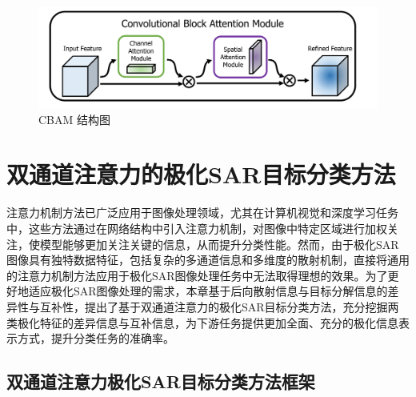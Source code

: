 \begin{figure}[h]
    \centering
    \includegraphics[width=14cm]{pic/chapter3/CBAM.jpg}
    \caption{CBAM 结构图}
    \label{CBAM}
\end{figure}

\section{双通道注意力的极化SAR目标分类方法}

注意力机制方法已广泛应用于图像处理领域，尤其在计算机视觉和深度学习任务中，这些方法通过在网络结构中引入注意力机制，对图像中特定区域进行加权关注，使模型能够更加关注关键的信息，从而提升分类性能。然而，由于极化SAR图像具有独特数据特征，包括复杂的多通道信息和多维度的散射机制，直接将通用的注意力机制方法应用于极化SAR图像处理任务中无法取得理想的效果。为了更好地适应极化SAR图像处理的需求，本章基于后向散射信息与目标分解信息的差异性与互补性，提出了基于双通道注意力的极化SAR目标分类方法，充分挖掘两类极化特征的差异信息与互补信息，为下游任务提供更加全面、充分的极化信息表示方式，提升分类任务的准确率。

\subsection{双通道注意力极化SAR目标分类方法框架}

